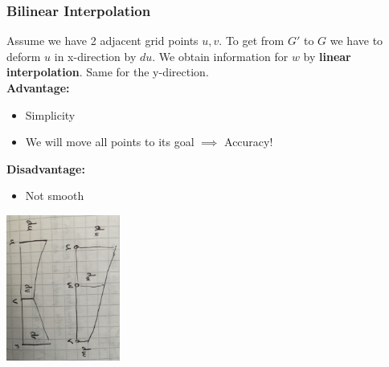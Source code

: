 \documentclass{exerciseBlue}
\begin{document}
\subsubsection{Bilinear Interpolation}
Assume we have 2 adjacent grid points $u,v$. To get from $G'$ to $G$ we have to deform $u$ in x-direction by $du$. We obtain information for $w$ by \textbf{linear interpolation}. Same for the y-direction.\\
\textbf{Advantage:} \begin{itemize}
	\item Simplicity
	\item We will move all points to its goal $\implies$ Accuracy!
\end{itemize}
\textbf{Disadvantage:} \begin{itemize}
	\item Not smooth
\end{itemize}
\begin{center}
	\includegraphics[height = 4.8cm]{Images/BilinearInterpolation}
\end{center}
\end{document}
